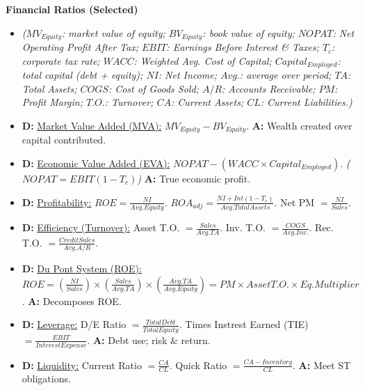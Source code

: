 \documentclass[7pt,landscape]{extarticle} %
\newcommand{\cheatsheetsubsubsection}[1]{%
  \vspace{0.15ex plus 0.05ex minus 0.05ex}%
  \noindent\textbf{\sffamily\scriptsize #1}%
  \par\vspace{0.05ex}%
}
\newcommand{\D}[1]{\textbf{\textcolor{DefColor}{D:}} \uline{#1}}
\newcommand{\A}[1]{\textbf{\textcolor{AppColor}{A:}} #1}
\newcommand{\SF}[1]{\textit{\small (#1)}} %
\begin{document}
\begin{multicols*}{4}
  \cheatsheetsubsubsection{Financial Ratios (Selected)}
  \begin{itemize}
    \item \SF{$MV_{Equity}$: market value of equity; $BV_{Equity}$: book value of equity; $NOPAT$: Net Operating Profit After Tax; $EBIT$: Earnings Before Interest \& Taxes; $T_c$: corporate tax rate; $WACC$: Weighted Avg. Cost of Capital; $Capital_{Employed}$: total capital (debt + equity); $NI$: Net Income; $Avg.$: average over period; $TA$: Total Assets; $COGS$: Cost of Goods Sold; $A/R$: Accounts Receivable; $PM$: Profit Margin; $T.O.$: Turnover; $CA$: Current Assets; $CL$: Current Liabilities.}
    \item \D{Market Value Added (MVA):} $MV_{Equity} - BV_{Equity}$. \A{Wealth created over capital contributed.}
    \item \D{Economic Value Added (EVA):} $NOPAT - (WACC \times Capital_{Employed})$.
          \SF{$NOPAT = EBIT(1-T_c)$} \A{True economic profit.}
    \item \D{Profitability:} $ROE = \frac{NI}{Avg.Equity}$. $ROA_{adj} = \frac{NI+Int(1-T_c)}{Avg.TotalAssets}$. Net PM $= \frac{NI}{Sales}$.
    \item \D{Efficiency (Turnover):} Asset T.O. $= \frac{Sales}{Avg.TA}$. Inv. T.O. $= \frac{COGS}{Avg.Inv.}$. Rec. T.O. $= \frac{Credit Sales}{Avg.A/R}$.
    \item \D{Du Pont System (ROE):} $ROE = (\frac{NI}{Sales}) \times (\frac{Sales}{Avg.TA}) \times (\frac{Avg.TA}{Avg.Equity}) = PM \times Asset T.O. \times Eq.Multiplier$. \A{Decomposes ROE.}
    \item \D{Leverage:} D/E Ratio $= \frac{Total Debt}{Total Equity}$. Times Instrest Earned (TIE) $= \frac{EBIT}{Interest Expense}$. \A{Debt use; risk \& return.}
    \item \D{Liquidity:} Current Ratio $= \frac{CA}{CL}$. Quick Ratio $= \frac{CA-Inventory}{CL}$. \A{Meet ST obligations.}
  \end{itemize}
  

\end{multicols*}
\end{document}
